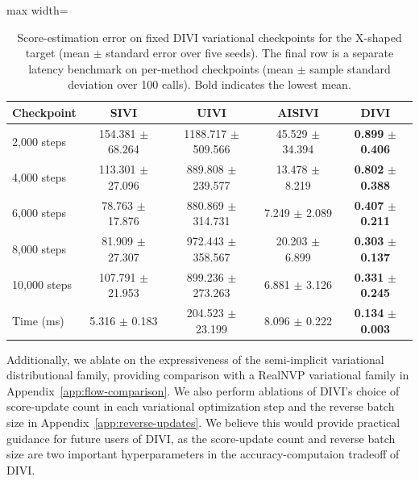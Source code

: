 \begin{table}[!htbp]
\centering
\caption{Score-estimation error on fixed DIVI variational checkpoints for the X-shaped target (mean $\pm$ standard error over five seeds). The final row is a separate latency benchmark on per-method checkpoints (mean $\pm$ sample standard deviation over 100 calls). Bold indicates the lowest mean.}
\label{tab:score-estimation-error}
\small
\setlength{\tabcolsep}{3pt}
\begin{adjustbox}{max width=\linewidth}
\begin{tabular}{lcccc}
\toprule
Checkpoint & SIVI & UIVI & AISIVI & DIVI \\
\midrule
2,000 steps & 154.381 {\footnotesize $\pm$ 68.264} & 1188.717 {\footnotesize $\pm$ 509.566} & 45.529 {\footnotesize $\pm$ 34.394} & \textbf{0.899} {\footnotesize $\boldsymbol{\pm}$ \textbf{0.406}} \\[2pt]
4,000 steps & 113.301 {\footnotesize $\pm$ 27.096} & 889.808 {\footnotesize $\pm$ 239.577} & 13.478 {\footnotesize $\pm$ 8.219} & \textbf{0.802} {\footnotesize $\boldsymbol{\pm}$ \textbf{0.388}} \\[2pt]
6,000 steps & 78.763 {\footnotesize $\pm$ 17.876} & 880.869 {\footnotesize $\pm$ 314.731} & 7.249 {\footnotesize $\pm$ 2.089} & \textbf{0.407} {\footnotesize $\boldsymbol{\pm}$ \textbf{0.211}} \\[2pt]
8,000 steps & 81.909 {\footnotesize $\pm$ 27.307} & 972.443 {\footnotesize $\pm$ 358.567} & 20.203 {\footnotesize $\pm$ 6.899} & \textbf{0.303} {\footnotesize $\boldsymbol{\pm}$ \textbf{0.137}} \\[2pt]
10,000 steps & 107.791 {\footnotesize $\pm$ 21.953} & 899.236 {\footnotesize $\pm$ 273.263} & 6.881 {\footnotesize $\pm$ 3.126} & \textbf{0.331} {\footnotesize $\boldsymbol{\pm}$ \textbf{0.245}} \\[2pt]
\midrule
Time (ms) & 5.316 {\footnotesize $\pm$ 0.183} & 204.523 {\footnotesize $\pm$ 23.199} & 8.096 {\footnotesize $\pm$ 0.222} & \textbf{0.134} {\footnotesize $\boldsymbol{\pm}$ \textbf{0.003}} \\
\bottomrule
\end{tabular}
\end{adjustbox}
\end{table}


Additionally, we ablate on the expressiveness of the semi-implicit variational distributional family, providing comparison with a RealNVP variational family in Appendix~\ref{app:flow-comparison}. We also perform ablations of DIVI's choice of score-update count in each variational optimization step and the reverse batch size in Appendix~\ref{app:reverse-updates}. We believe this would provide practical guidance for future users of DIVI, as the score-update count and reverse batch size are two important hyperparameters in the accuracy-computaion tradeoff of DIVI.
